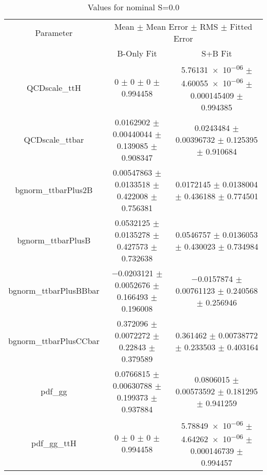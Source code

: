 \begin{table}
\centering
\caption{Values for nominal S=0.0}
\begin{tabular}{ccc}
\toprule
Parameter & \multicolumn{2}{c}{Mean $\pm$ Mean Error $\pm$ RMS $\pm$ Fitted Error}\\
 & B-Only Fit & S+B Fit\\
\midrule
QCDscale\_ttH & \num{0} $\pm$ \num{0} $\pm$ \num{0} $\pm$ \num{0.994458} & \num{5.76131e-06} $\pm$ \num{4.60055e-06} $\pm$ \num{0.000145409} $\pm$ \num{0.994385}\\
QCDscale\_ttbar & \num{0.0162902} $\pm$ \num{0.00440044} $\pm$ \num{0.139085} $\pm$ \num{0.908347} & \num{0.0243484} $\pm$ \num{0.00396732} $\pm$ \num{0.125395} $\pm$ \num{0.910684}\\
bgnorm\_ttbarPlus2B & \num{0.00547863} $\pm$ \num{0.0133518} $\pm$ \num{0.422008} $\pm$ \num{0.756381} & \num{0.0172145} $\pm$ \num{0.0138004} $\pm$ \num{0.436188} $\pm$ \num{0.774501}\\
bgnorm\_ttbarPlusB & \num{0.0532125} $\pm$ \num{0.0135278} $\pm$ \num{0.427573} $\pm$ \num{0.732638} & \num{0.0546757} $\pm$ \num{0.0136053} $\pm$ \num{0.430023} $\pm$ \num{0.734984}\\
bgnorm\_ttbarPlusBBbar & \num{-0.0203121} $\pm$ \num{0.0052676} $\pm$ \num{0.166493} $\pm$ \num{0.196008} & \num{-0.0157874} $\pm$ \num{0.00761123} $\pm$ \num{0.240568} $\pm$ \num{0.256946}\\
bgnorm\_ttbarPlusCCbar & \num{0.372096} $\pm$ \num{0.0072272} $\pm$ \num{0.22843} $\pm$ \num{0.379589} & \num{0.361462} $\pm$ \num{0.00738772} $\pm$ \num{0.233503} $\pm$ \num{0.403164}\\
pdf\_gg & \num{0.0766815} $\pm$ \num{0.00630788} $\pm$ \num{0.199373} $\pm$ \num{0.937884} & \num{0.0806015} $\pm$ \num{0.00573592} $\pm$ \num{0.181295} $\pm$ \num{0.941259}\\
pdf\_gg\_ttH & \num{0} $\pm$ \num{0} $\pm$ \num{0} $\pm$ \num{0.994458} & \num{5.78849e-06} $\pm$ \num{4.64262e-06} $\pm$ \num{0.000146739} $\pm$ \num{0.994457}\\
\bottomrule
\end{tabular}
\end{table}